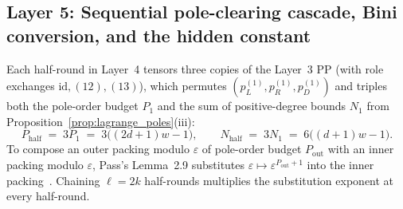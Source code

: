 \documentclass[11pt,a4paper]{article}
\theoremstyle{plain}
\theoremstyle{definition}
\theoremstyle{remark}
\begin{document}
\subsection{Layer 5: Sequential pole-clearing cascade, Bini conversion, and the hidden constant}
\label{subsec:layer5}

Each half-round in Layer~4 tensors three copies of the Layer~3 PP (with role exchanges $\mathrm{id}, (12), (13)$), which permutes $(p_L^{(1)}, p_R^{(1)}, p_D^{(1)})$ and triples both the pole-order budget $P_1$ and the sum of positive-degree bounds $N_1$ from Proposition~\ref{prop:lagrange_poles}(iii):
\begin{equation}
    P_{\mathrm{half}} \;=\; 3 P_1 \;=\; 3\bigl((2d + 1)w - 1\bigr), \qquad N_{\mathrm{half}} \;=\; 3 N_1 \;=\; 6\bigl((d + 1)w - 1\bigr) .
    \label{eq:half_round_poles}
\end{equation}
To compose an outer packing modulo $\varepsilon$ of pole-order budget $P_{\mathrm{out}}$ with an inner packing modulo $\varepsilon$, Pass's Lemma~2.9 substitutes $\varepsilon \mapsto \varepsilon^{P_{\mathrm{out}} + 1}$ into the inner packing~\cite[Appendix~A.2]{Pass2026}. Chaining $\ell = 2k$ half-rounds multiplies the substitution exponent at every half-round.
\end{document}
